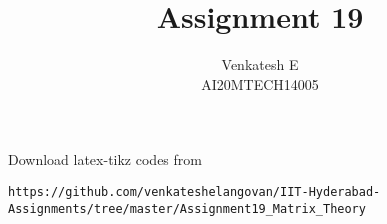 \documentclass[journal,12pt]{IEEEtran}
\begin{document}
\onecolumn

\newtheorem{theorem}{Theorem}[section]
\newtheorem{problem}{Problem}
\newtheorem{proposition}{Proposition}[section]
\newtheorem{lemma}{Lemma}[section]
\newtheorem{corollary}[theorem]{Corollary}
\newtheorem{example}{Example}[section]
\newtheorem{definition}[problem]{Definition}

\newcommand{\BEQA}{\begin{eqnarray}}
\newcommand{\EEQA}{\end{eqnarray}}
\newcommand{\define}{\stackrel{\triangle}{=}}

\raggedbottom
\setlength{\parindent}{0pt}
\providecommand{\mbf}{\mathbf}
\providecommand{\pr}[1]{\ensuremath{\Pr\left(#1\right)}}
\providecommand{\qfunc}[1]{\ensuremath{Q\left(#1\right)}}
\providecommand{\sbrak}[1]{\ensuremath{{}\left[#1\right]}}
\providecommand{\lsbrak}[1]{\ensuremath{{}\left[#1\right.}}
\providecommand{\rsbrak}[1]{\ensuremath{{}\left.#1\right]}}
\providecommand{\brak}[1]{\ensuremath{\left(#1\right)}}
\providecommand{\lbrak}[1]{\ensuremath{\left(#1\right.}}
\providecommand{\rbrak}[1]{\ensuremath{\left.#1\right)}}
\providecommand{\cbrak}[1]{\ensuremath{\left\{#1\right\}}}
\providecommand{\lcbrak}[1]{\ensuremath{\left\{#1\right.}}
\providecommand{\rcbrak}[1]{\ensuremath{\left.#1\right\}}}
\theoremstyle{remark}
\newtheorem{rem}{Remark}
\newcommand{\sgn}{\mathop{\mathrm{sgn}}}
\providecommand{\system}{\overset{\mathcal{H}}{ \longleftrightarrow}}
\newcommand{\solution}{\noindent \textbf{Solution: }}
\newcommand{\cosec}{\,\text{cosec}\,}
\providecommand{\dec}[2]{\ensuremath{\overset{#1}{\underset{#2}{\gtrless}}}}
\newcommand{\myvec}[1]{\ensuremath{\begin{pmatrix}#1\end{pmatrix}}}
\newcommand{\mydet}[1]{\ensuremath{\begin{vmatrix}#1\end{vmatrix}}}
\makeatletter
{}
\makeatother
\let\StandardTheFigure\thefigure
\let\vec\mathbf
\renewcommand{\thefigure}{\theproblem}
\def\putbox#1#2#3{\makebox[0in][l]{\makebox[#1][l]{}\raisebox{\baselineskip}[0in][0in]{\raisebox{#2}[0in][0in]{#3}}}}
     \def\rightbox#1{\makebox[0in][r]{#1}}
     \def\centbox#1{\makebox[0in]{#1}}
     \def\topbox#1{\raisebox{-\baselineskip}[0in][0in]{#1}}
     \def\midbox#1{\raisebox{-0.5\baselineskip}[0in][0in]{#1}}
\vspace{3cm}
\title{Assignment 19}
\author{Venkatesh E\\AI20MTECH14005}
\maketitle
\bigskip
\renewcommand{\thefigure}{\theenumi}
\renewcommand{\thetable}{\theenumi}
Download latex-tikz codes from
\begin{lstlisting}
https://github.com/venkateshelangovan/IIT-Hyderabad-Assignments/tree/master/Assignment19_Matrix_Theory
\end{lstlisting}
\end{document}
